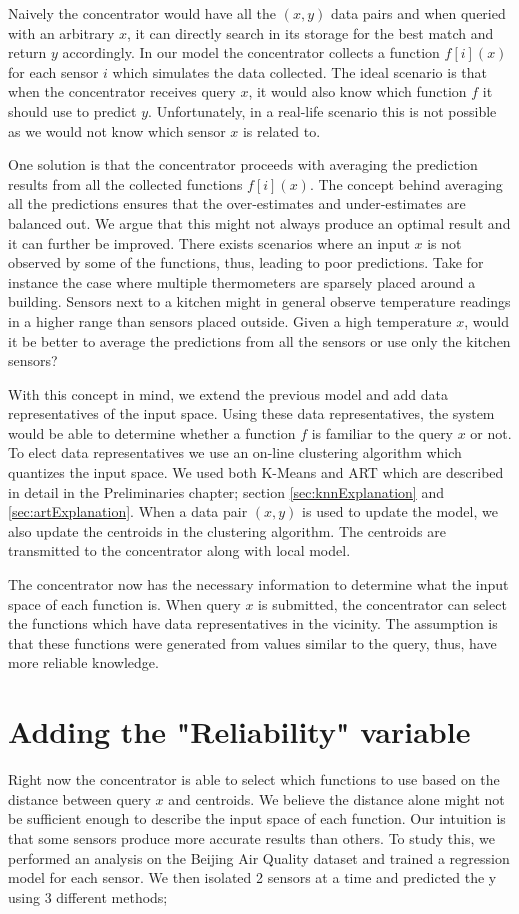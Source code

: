 \documentclass{mproj}
\begin{document}
Naively the concentrator would have all the $(x,y)$ data pairs and when queried with an arbitrary $x$, it can directly search in its storage for the best match and return $y$ accordingly. In our model the concentrator collects a function $f[i](x)$ for each sensor $i$ which simulates the data collected. The ideal scenario is that when the concentrator receives query $x$, it would also know which function $f$ it should use to predict $y$. Unfortunately, in a real-life scenario this is not possible as we would not know which sensor $x$ is related to.

One solution is that the concentrator proceeds with averaging the prediction results from all the collected functions $f[i](x)$. The concept behind averaging all the predictions ensures that the over-estimates and under-estimates are balanced out. We argue that this might not always produce an optimal result and it can further be improved. There exists scenarios where an input $x$ is not observed by some of the functions, thus, leading to poor predictions. Take for instance the case where multiple thermometers are sparsely placed around a building. Sensors next to a kitchen might in general observe temperature readings in a higher range than sensors placed outside. Given a high temperature $x$, would it be better to average the predictions from all the sensors or use only the kitchen sensors?

With this concept in mind, we extend the previous model and add data representatives of the input space. Using these data representatives, the system would be able to determine whether a function $f$ is familiar to the query $x$ or not. To elect data representatives we use an on-line clustering algorithm which quantizes the input space. We used both K-Means and ART which are described in detail in the Preliminaries chapter; section \ref{sec:knnExplanation} and \ref{sec:artExplanation}. When a data pair $(x,y)$ is used to update the model, we also update the centroids in the clustering algorithm. The centroids are transmitted to the concentrator along with local model.

The concentrator now has the necessary information to determine what the input space of each function is. When query $x$ is submitted, the concentrator can select the functions which have data representatives in the vicinity. The assumption is that these functions were generated from values similar to the query, thus, have more reliable knowledge.

\section{Adding the "Reliability" variable}
\label{sec:reliabilityVariable}
Right now the concentrator is able to select which functions to use based on the distance between query $x$ and centroids. We believe the distance alone might not be sufficient enough to describe the input space of each function. Our intuition is that some sensors produce more accurate results than others. To study this, we performed an analysis on the Beijing Air Quality dataset \cite{air-quality-inference-meets-big-data} and trained a regression model for each sensor. We then isolated 2 sensors at a time and predicted the y using 3 different methods; 
\end{document}
